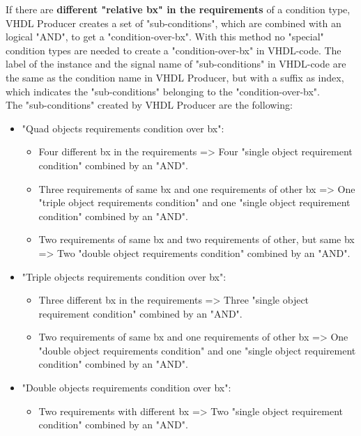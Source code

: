 If there are \textbf{different "relative bx" in the requirements} of a condition type, VHDL Producer creates a set of "sub-conditions", which are combined with an logical "AND", to get a "condition-over-bx".
With this method no "special" condition types are needed to create a "condition-over-bx" in VHDL-code. The label of the instance and the signal name of "sub-conditions" in VHDL-code are the
same as the condition name in VHDL Producer, but with a suffix as index, which indicates the "sub-conditions" belonging to the "condition-over-bx".\\
The "sub-conditions" created by VHDL Producer are the following:
\begin{itemize}
\item "Quad objects requirements condition over bx":
    \begin{itemize}
    \item Four different bx in the requirements => Four "single object requirement condition" combined by an "AND".
    \item Three requirements of same bx and one requirements of other bx => One "triple object requirements condition" and one "single object requirement condition" combined by an "AND".
    \item Two requirements of same bx and two requirements of other, but same bx => Two "double object requirements condition" combined by an "AND".
    \end{itemize}
\item "Triple objects requirements condition over bx":
    \begin{itemize}
    \item Three different bx in the requirements => Three "single object requirement condition" combined by an "AND".
    \item Two requirements of same bx and one requirements of other bx => One "double object requirements condition" and one "single object requirement condition" combined by an "AND".
    \end{itemize}
\item "Double objects requirements condition over bx":
    \begin{itemize}
    \item Two requirements with different bx => Two "single object requirement condition" combined by an "AND".
    \end{itemize}
\end{itemize}

